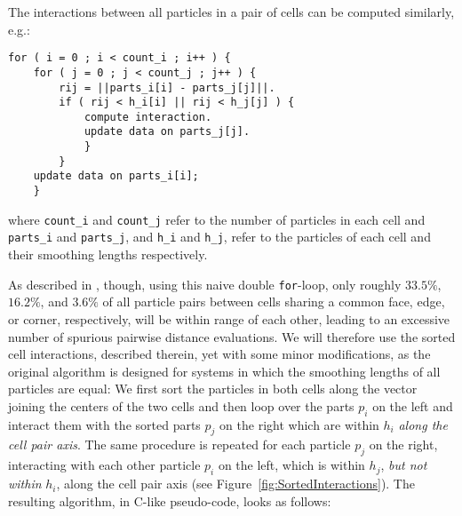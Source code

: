 \documentclass[final]{siamltex}
\newcommand{\fig}[1]
    {Figure~\ref{fig:#1}}
\begin{document}
The interactions between all particles in a pair of cells
can be computed similarly, e.g.:
   
\begin{center}\begin{minipage}{0.8\textwidth}
    \begin{lstlisting}
for ( i = 0 ; i < count_i ; i++ ) {
    for ( j = 0 ; j < count_j ; j++ ) {
        rij = ||parts_i[i] - parts_j[j]||.
        if ( rij < h_i[i] || rij < h_j[j] ) {
            compute interaction.
            update data on parts_j[j].
            }
        }
    update data on parts_i[i];
    }
    \end{lstlisting}
\end{minipage}\end{center}

\noindent where {\tt count\_i} and {\tt count\_j} refer to
the number of particles in each cell and {\tt parts\_i} and
{\tt parts\_j}, and {\tt h\_i} and {\tt h\_j}, refer to the
particles of each cell and their smoothing lengths respectively.

As described in \cite{ref:Gonnet2007}, though, using this
naive double {\tt for}-loop, only roughly $33.5\%$, $16.2\%$,
and $3.6\%$ of all particle
pairs between cells sharing a common face, edge, or corner, respectively,
will be within range of each other, leading
to an excessive number of spurious pairwise distance evaluations.
We will therefore use the sorted cell
interactions, described therein, yet with some minor modifications, as
the original algorithm is designed for systems in which the
smoothing lengths of all particles are equal:
We first sort the particles in both cells along the vector joining
the centers of the two cells and then loop over the
parts $p_i$ on the left and interact them with the sorted parts $p_j$
on the right which are within $h_i$ {\em along the cell pair axis}.
The same procedure is repeated for each particle $p_j$ on the
right, interacting with each other particle $p_i$ on the
left, which is within $h_j$, {\em but not within} $h_i$, along
the cell pair axis (see \fig{SortedInteractions}).
The resulting algorithm, in C-like pseudo-code, looks as follows:
        
\end{document}
